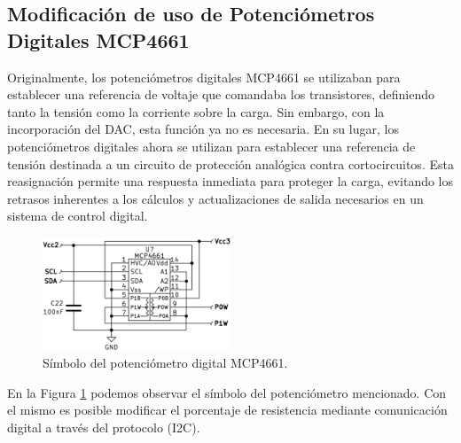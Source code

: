 \subsection{Modificación de uso de Potenciómetros Digitales MCP4661}
Originalmente, los potenciómetros digitales MCP4661 se utilizaban para establecer una referencia de voltaje que comandaba los transistores, definiendo tanto la tensión como la corriente sobre la carga. Sin embargo, con la incorporación del DAC, esta función ya no es necesaria. En su lugar, los potenciómetros digitales ahora se utilizan para establecer una referencia de tensión destinada a un circuito de protección analógica contra cortocircuitos. Esta reasignación permite una respuesta inmediata para proteger la carga, evitando los retrasos inherentes a los cálculos y actualizaciones de salida necesarios en un sistema de control digital.\par
\begin{figure}[H]
    \centering
    \includegraphics[width=0.5\textwidth]{./imagenes/potenciometro_digital.png}
    \caption{Símbolo del potenciómetro digital MCP4661.}
    \label{F:potenciometro_digital}
\end{figure}
En la Figura \ref{F:potenciometro_digital} podemos observar el símbolo del potenciómetro mencionado. Con el mismo es posible modificar el porcentaje de resistencia mediante comunicación digital a través del protocolo  (I2C). \cite{MCP4661}

